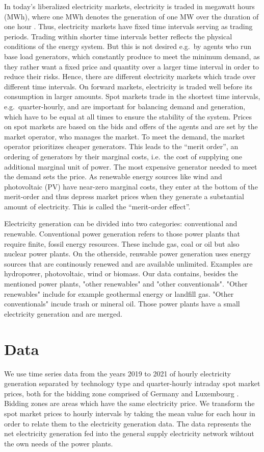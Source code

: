 \documentclass{article}
\begin{document}
In today's liberalized electricity markets, electricity is traded in megawatt hours (MWh), where one MWh denotes the generation of one MW over the duration of one hour \citep{markets_for_electrical_energy}.
Thus, electricity markets have fixed time intervals serving as trading periods.
Trading within shorter time intervals better reflects the physical conditions of the energy system.
But this is not desired e.g.\ by agents who run base load generators, which constantly produce to meet the minimum demand, as they rather want a fixed price and quantity over a larger time interval in order to reduce their risks.
Hence, there are different electricity markets which trade over different time intervals.
On forward markets, electricity is traded well before its consumption in larger amounts.
Spot markets trade in the shortest time intervals, e.g.\ quarter-hourly, and are important for balancing demand and generation, which have to be equal at all times to ensure the stability of the system.
Prices on spot markets are based on the bids and offers of the agents and are set by the market operator, who manages the market.
To meet the demand, the market operator prioritizes cheaper generators.
This leads to the \enquote{merit order}, an ordering of generators by their marginal costs, i.e.\ the cost of supplying one additional marginal unit of power.
The most expensive generator needed to meet the demand sets the price.
As renewable energy sources like wind and photovoltaic (PV) have near-zero marginal costs, they enter at the bottom of the merit-order and thus depress market prices when they generate a substantial amount of electricity.
This is called the \enquote{merit-order effect}.

Electricity generation can be divided into two categories: conventional and renewable. Conventional power generation refers to those power plants that require finite, fossil energy resources. These include gas, coal or oil but also nuclear power plants. On the otherside, renwable power generation uses energy sources that are continously renewed and are available unlimited. Examples are hydropower, photovoltaic, wind or biomass. Our data contains, besides the mentioned power plants, "other renewables" and "other conventionals". "Other renewables" include for example geothermal energy or landfill gas. "Other conventionals" incude trash or mineral oil. Those power plants have a small electricity generation and are merged. 

\section{Data}
We use time series data from the years 2019 to 2021 of hourly electricity generation separated by technology type and quarter-hourly intraday spot market prices, both for the bidding zone comprised of Germany and Luxembourg \citep{smard}.
Bidding zones are areas which have the same electricity price.
We transform the spot market prices to hourly intervals by taking the mean value for each hour in order to relate them to the electricity generation data.
The data represents the net electricity generation fed into the general supply electricity network wihtout the own needs of the power plants.
\end{document}
